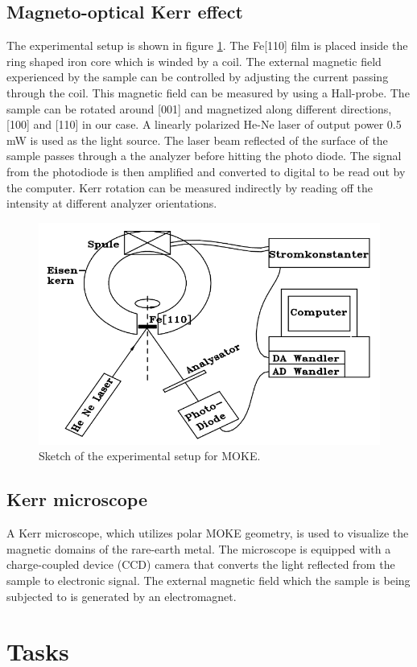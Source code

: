 \documentclass{article}
\begin{document}
\subsection{Magneto-optical Kerr effect}
The experimental setup is shown in figure \ref{fig:exp_setup}. The Fe[110] film is placed inside the ring shaped iron core which is winded by a coil. The external magnetic field experienced by the sample can be controlled by adjusting the current passing through the coil. This magnetic field can be measured by using a Hall-probe. The sample can be rotated around [001] and magnetized along different directions, [100] and [110] in our case. A linearly polarized He-Ne laser of output power 0.5 mW is used as the light source. The laser beam reflected of the surface of the sample passes through a the analyzer before hitting the photo diode. The signal from the photodiode is then amplified and converted to digital to be read out by the computer. Kerr rotation can be measured indirectly by reading off the intensity at different analyzer orientations.
\begin{figure}[h!]
\centering
\includegraphics[width=0.6\linewidth]{LAB/MOKE/experimental_setup.PNG}
\caption{Sketch of the experimental setup for MOKE.}
\label{fig:exp_setup}
\end{figure}
\subsection{Kerr microscope}
A Kerr microscope, which utilizes polar MOKE geometry, is used to visualize the magnetic domains of the rare-earth metal. The microscope is equipped with a charge-coupled device (CCD) camera that converts the light reflected from the sample to electronic signal. The external magnetic field which the sample is being subjected to is generated by an electromagnet.
\clearpage
\section{Tasks}
\end{document}
